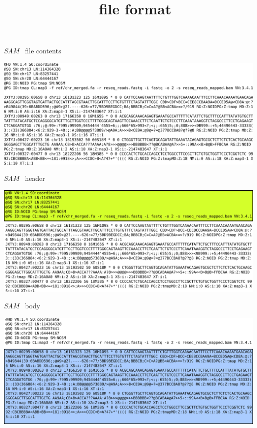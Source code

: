 \documentclass{beamer}
\title{\sam~ file format}
\date{}
\newcommand{\sam}{\textit{SAM}}
\begin{document}
\frame{\titlepage}

\begin{frame}{\sam~ file contents}
  \begin{center}
    \includegraphics[width=\linewidth, keepaspectratio]{pic/sam_full.png}
  \end{center}
\end{frame}

\begin{frame}{\sam~ header}
  \begin{center}
    \includegraphics[width=\linewidth, keepaspectratio]{pic/sam_full_h.png}
  \end{center}
\end{frame}

\begin{frame}{\sam~ body}
  \begin{center}
    \includegraphics[width=\linewidth, keepaspectratio]{pic/sam_full_b.png}
  \end{center}
\end{frame}
\end{document}
